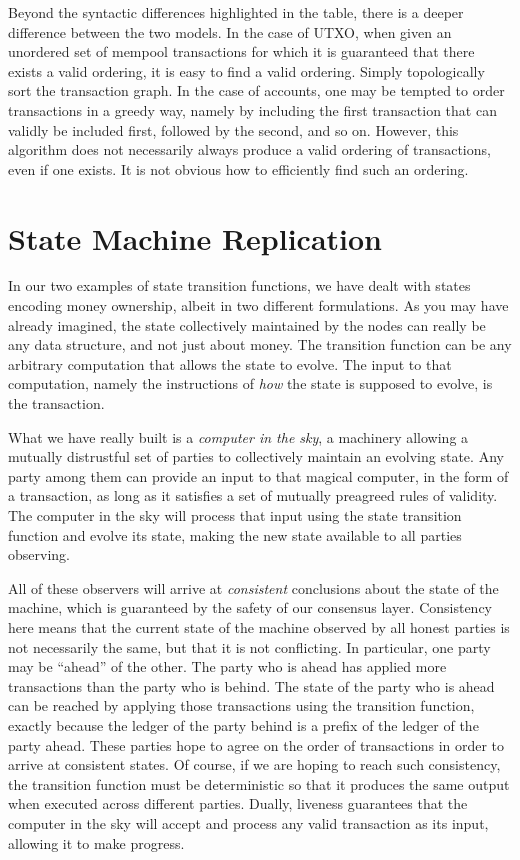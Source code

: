 Beyond the syntactic differences highlighted in the table, there is a deeper difference between the two models.
In the case of UTXO, when given an unordered set of mempool transactions for which it is guaranteed that there
exists a valid ordering, it is easy to find a valid ordering. Simply topologically sort the transaction graph.
In the case of accounts, one may be tempted to order transactions in a greedy way, namely by including the first
transaction that can validly be included first, followed by the second, and so on. However, this algorithm does
not necessarily always produce a valid ordering of transactions, even if one exists.
It is not obvious how to efficiently find such an ordering.


\section{State Machine Replication}

In our two examples of state transition functions, we have dealt with states encoding money ownership,
albeit in two different formulations. As you may have already imagined, the state collectively maintained
by the nodes can really be any data structure, and not just about money. The transition function
can be any arbitrary computation that allows the state to evolve. The input to that computation,
namely the instructions of \emph{how} the state is supposed to evolve, is the transaction.

What we have really built is a \emph{computer in the sky},
a machinery allowing a mutually distrustful
set of parties to collectively maintain an evolving state. Any party among them can provide an input
to that magical computer, in the form of a transaction, as long as it satisfies a set of mutually preagreed
rules of validity. The computer in the sky will process that input using the state transition function
and evolve its state, making the new state available to all parties observing.

All of these observers will arrive at \emph{consistent} conclusions about the state of the machine,
which is guaranteed by the safety of our consensus layer. Consistency here means that the current state
of the machine observed by all honest parties is not necessarily the same, but that it is not conflicting.
In particular, one party may be ``ahead'' of the other. The party who is ahead has applied more transactions
than the party who is behind. The state of the party who is ahead can be reached by applying those transactions
using the transition function, exactly because the ledger of the party behind is a prefix of the ledger of
the party ahead. These parties hope to agree on the order of transactions in order to arrive at consistent states.
Of course, if we are hoping to reach such consistency, the transition function must be deterministic so that
it produces the same output when executed across different parties.
Dually, liveness guarantees that the computer in the sky will accept and process any valid transaction
as its input, allowing it to make progress.

